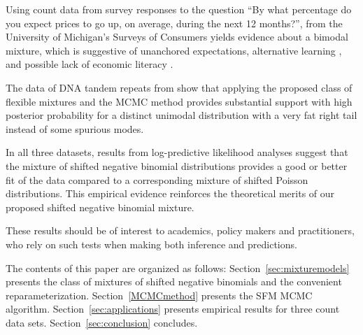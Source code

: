 \documentclass[11pt]{article}
\begin{document}
Using count data from survey responses to the question ``By what percentage do you expect prices to go up, on average, during the next 12 months?'', from the University of Michigan's Surveys of Consumers yields evidence about a bimodal mixture, which is suggestive of unanchored expectations, alternative learning \citep{pfajfar2010heterogeneity}, and possible lack  of economic literacy \citep{burke2014economic}.  

The data of DNA tandem repeats from \cite{DNA_leiden} show that applying the proposed class of flexible mixtures and the MCMC method provides substantial support with high posterior probability for a distinct unimodal distribution with a very fat right tail instead of some spurious modes.

In all three datasets, results from log-predictive likelihood analyses suggest that the mixture of shifted negative binomial distributions provides a good or better fit of the data compared to a corresponding mixture of shifted Poisson distributions. This empirical evidence reinforces the theoretical merits of our proposed shifted negative binomial mixture.


These results should be of interest to academics, policy makers and practitioners, who rely on such tests when making both inference and predictions.

The contents of this paper are organized as follows: Section~\ref{sec:mixturemodels} presents the class of mixtures of shifted negative binomials and the convenient reparameterization.
Section~\ref{MCMCmethod} presents the SFM MCMC algorithm. 
Section~\ref{sec:applications} presents empirical results for three count data sets. Section~\ref{sec:conclusion} concludes. 



\end{document}
